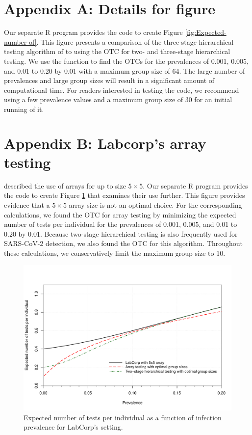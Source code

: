 \section{Appendix A: Details for figure}

Our separate R program provides the code to create Figure \ref{fig:Expected-number-of}.
This figure presents a comparison of the three-stage hierarchical
testing algorithm of \citet{lohse2020pooling} to using the OTC for
two- and three-stage hierarchical testing. We use the 
function to find the OTCs for the prevalences of 0.001, 0.005, and
0.01 to 0.20 by 0.01 with a maximum group size of 64. The large number
of prevalences and large group sizes will result in a significant
amount of computational time. For readers interested in testing the
code, we recommend using a few prevalence values and a maximum group
size of 30 for an initial running of it. 

\section{Appendix B: Labcorp's array testing}

\citet{LabCorp} described the use of arrays for up to size $5\times5$.
Our separate R program provides the code  to create Figure \ref{fig:LabCorp}
that examines their use further. This figure  provides evidence that
a $5\times5$ array size is not an optimal choice. For the corresponding
calculations, we found the OTC for array testing by minimizing the
expected number of tests per individual for the prevalences of 0.001,
0.005, and 0.01 to 0.20 by 0.01. Because two-stage hierarchical testing
is also frequently used for SARS-CoV-2 detection, we also found the
OTC for this algorithm. Throughout these calculations, we conservatively
limit the maximum group size to 10. 

\begin{figure}
\noindent \begin{centering}
\includegraphics[scale=0.55]{figures/LabCorp.pdf}
\par\end{centering}
\caption{Expected number of tests per individual as a function of infection
prevalence for LabCorp's setting. \label{fig:LabCorp}}
\end{figure}

